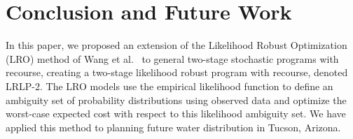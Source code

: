 \documentclass[12pt]{amsart}
\begin{document}
% 

\section{Conclusion and Future Work}
\label{sec:concl}

In this paper, we proposed an extension of the Likelihood Robust Optimization (LRO) method of Wang et al.\ \cite{wang2010likelihood} to general two-stage stochastic programs with recourse, creating a two-stage likelihood robust program with recourse, denoted LRLP-2.
The LRO models use the empirical likelihood function to define an ambiguity set of probability distributions using observed data and optimize the worst-case expected cost with respect to this likelihood ambiguity set.
We have%
applied this method to planning future water distribution in Tucson, Arizona.
\end{document}
